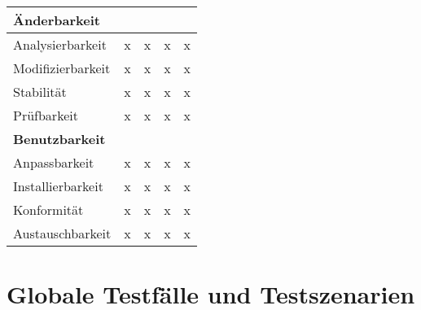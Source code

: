\documentclass[parskip=full,11pt]{scrartcl}
\begin{document}
\begin{table}[H]
\begin{center}
\begin{tabularx}{\textwidth}{X c c c c}
	  \hline	  	
	  \multicolumn{5}{l}{\textbf{Änderbarkeit}}\\
      \hline
      Analysierbarkeit & x & x & x & x\\
	  Modifizierbarkeit & x & x & x & x\\
	  Stabilität & x & x & x & x\\
	  Prüfbarkeit & x & x & x & x\\
	  
	  \hline	  	
	  \multicolumn{5}{l}{\textbf{Benutzbarkeit}}\\
      \hline
      Anpassbarkeit & x & x & x & x\\
	  Installierbarkeit & x & x & x & x\\
	  Konformität & x & x & x & x\\
	  Austauschbarkeit & x & x & x & x\\
	  
	  \hline      			
    \end{tabularx}
  \end{center}
  
\end{table}
\renewcommand{\arraystretch}{1}
\section{Globale Testfälle und Testszenarien}

\newpage
\printglossary	
\end{document}
